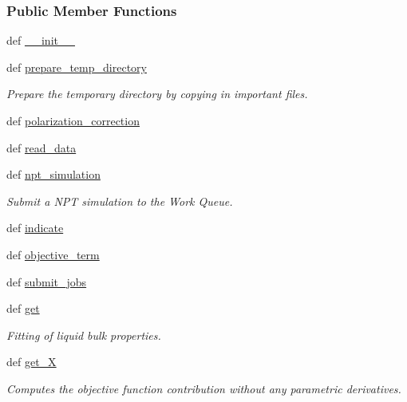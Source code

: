\subsubsection*{Public Member Functions}
\begin{DoxyCompactItemize}
\item 
def \hyperlink{classforcebalance_1_1openmmio_1_1Liquid__OpenMM_a92379bd73128234b309fae789946035d}{\-\_\-\-\_\-init\-\_\-\-\_\-}
\item 
def \hyperlink{classforcebalance_1_1openmmio_1_1Liquid__OpenMM_a7174206ab04fbd77695ef6fc5aa0da1e}{prepare\-\_\-temp\-\_\-directory}
\begin{DoxyCompactList}\small\item\em Prepare the temporary directory by copying in important files. \end{DoxyCompactList}\item 
def \hyperlink{classforcebalance_1_1openmmio_1_1Liquid__OpenMM_ae4f88de8f954c789b003e33909585077}{polarization\-\_\-correction}
\item 
def \hyperlink{classforcebalance_1_1liquid_1_1Liquid_a08b698af913d56f780d0587821c922cd}{read\-\_\-data}
\item 
def \hyperlink{classforcebalance_1_1liquid_1_1Liquid_a07a59f9f335693329b789a9c7608fc9f}{npt\-\_\-simulation}
\begin{DoxyCompactList}\small\item\em Submit a N\-P\-T simulation to the Work Queue. \end{DoxyCompactList}\item 
def \hyperlink{classforcebalance_1_1liquid_1_1Liquid_ae94ce30dfd0e92fdd6d746e6743be844}{indicate}
\item 
def \hyperlink{classforcebalance_1_1liquid_1_1Liquid_a00c23db61bcb86cc19f79dacdb2bc1f3}{objective\-\_\-term}
\item 
def \hyperlink{classforcebalance_1_1liquid_1_1Liquid_a716e28bb5572b3273036ac753b7e1e1d}{submit\-\_\-jobs}
\item 
def \hyperlink{classforcebalance_1_1liquid_1_1Liquid_a802c4139e5c002fabdeab5de88093880}{get}
\begin{DoxyCompactList}\small\item\em Fitting of liquid bulk properties. \end{DoxyCompactList}\item 
def \hyperlink{classforcebalance_1_1target_1_1Target_a606dd136f195c267c05a2455405e5949}{get\-\_\-\-X}
\begin{DoxyCompactList}\small\item\em Computes the objective function contribution without any parametric derivatives. \end{DoxyCompactList}\item 

\end{DoxyCompactItemize}
